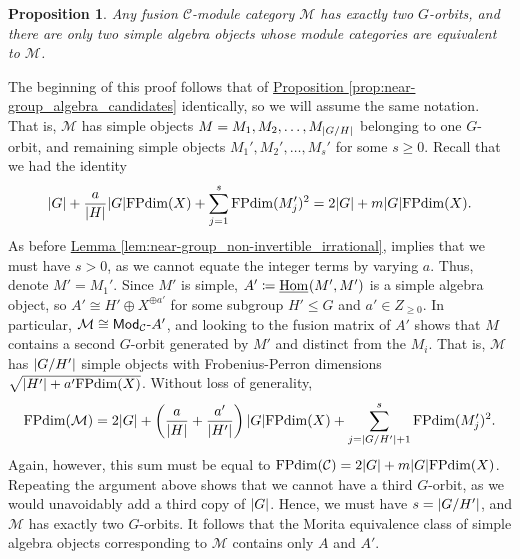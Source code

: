 \documentclass[12pt, reqno]{amsart}
\numberwithin{equation}{section}
\theoremstyle{plainspace}
\newtheorem{proposition}[theorem]{Proposition}
\theoremstyle{definitionspace}
\theoremstyle{remarkspace}
\renewenvironment{proof}{{\noindent\textbf{Proof.}}}{\null\hfill\qedsymbol}
\DeclarePairedDelimiter{\abs}{\lvert}{\rvert}
\newcommand{\mathcat}[1]{\mathcal{#1}}
\newcommand{\IntHom}[2][]{
	\ifthenelse{\equal{#2}{}}
		{\underline{\textup{Hom}}_{#1}}
		{\underline{\textup{Hom}}_{#1}\!\left(#2\right)}
}
\newcommand{\textcat}[1]{\textup{\textsf{#1}}}
\newcommand{\rmodcat}[2][]{\textcat{Mod}_{#1}\textcat{-}#2}
\newcommand{\FPdim}{\textup{FPdim}}
\begin{document}
\begin{proposition}\label{prop:near-group_algebra_orbits}
Any fusion $\mathcat{C}$-module category $\mathcat{M}$ has exactly two $G$-orbits, and there are only two simple algebra objects whose module categories are equivalent to $\mathcat{M}$.
\end{proposition}
\leavevmode\newline
\begin{proof}
\noindent The beginning of this proof follows that of \hyperref[prop:near-group_algebra_candidates]{Proposition \ref*{prop:near-group_algebra_candidates}} identically, so we will assume the same notation. That is, $\mathcat{M}$ has simple objects $M = M_1, M_2, \dots, M_{\abs{G/H}}$ belonging to one $G$-orbit, and remaining simple objects $M_1', M_2', \dots, M_s'$ for some $s \geq 0$. Recall that we had the identity
\begin{align*}
\begin{split}
\abs{G} + \frac{a}{\abs{H}}\abs{G}\FPdim(X) + \sum_{j=1}^{s}{\FPdim(M_j')^2} = 2\abs{G} + m\abs{G}\FPdim(X).
\end{split}
\end{align*}
\noindent As before \hyperref[lem:near-group_non-invertible_irrational]{Lemma \ref*{lem:near-group_non-invertible_irrational}}, implies that we must have $s > 0$, as we cannot equate the integer terms by varying $a$. Thus, denote $M' = M_1'$. Since $M'$ is simple, $A' \coloneqq \IntHom{M', M'}$ is a simple algebra object, so $A' \cong H' \oplus X^{\oplus a'}$ for some subgroup $H' \leq G$ and $a' \in Z_{\geq 0}$. In particular, $\mathcat{M} \cong \rmodcat[\mathcat{C}]{A'}$, and looking to the fusion matrix of $A'$ shows that $M$ contains a second $G$-orbit generated by $M'$ and distinct from the $M_i$. That is, $\mathcat{M}$ has $\abs{G/H'}$ simple objects with Frobenius-Perron dimensions $\sqrt{\abs{H'} + a'\FPdim(X)}$. Without loss of generality,
\begin{align*}
\begin{split}
\FPdim(\mathcat{M}) = 2\abs{G} + \left(\frac{a}{\abs{H}} + \frac{a'}{\abs{H'}}\right)\abs{G}\FPdim(X) + \sum_{j=\abs{G/H'}+1}^{s}{\FPdim(M_j')^2}.
\end{split}
\end{align*}
\noindent Again, however, this sum must be equal to $\FPdim(\mathcat{C}) = 2\abs{G} + m\abs{G}\FPdim(X)$. Repeating the argument above shows that we cannot have a third $G$-orbit, as we would unavoidably add a third copy of $\abs{G}$. Hence, we must have $s = \abs{G/H'}$, and $\mathcat{M}$ has exactly two $G$-orbits. It follows that the Morita equivalence class of simple algebra objects corresponding to $\mathcat{M}$ contains only $A$ and $A'$.
\end{proof}
\newline
\end{document}
